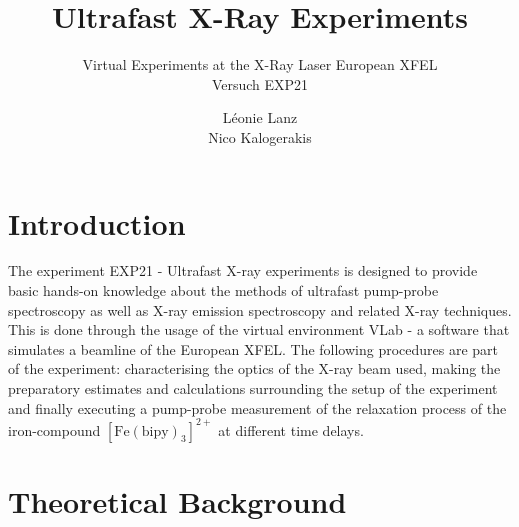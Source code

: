 \documentclass[10pt,a4paper, bibliography=totoc]{scrartcl}
\begin{document}

\title{Ultrafast X-Ray Experiments}
\subtitle{Virtual Experiments at the X-Ray Laser European XFEL\\ Versuch EXP21}
\author{Léonie Lanz \\ Nico Kalogerakis}
\maketitle
\newpage

\tableofcontents
\vfill
\newpage


\section{Introduction}
The experiment EXP21 - Ultrafast X-ray experiments is designed to provide basic hands-on knowledge about the methods of ultrafast pump-probe spectroscopy as well as X-ray emission spectroscopy and related X-ray techniques. This is done through the usage of the virtual environment VLab - a software that simulates a beamline of the European XFEL. The following procedures are part of the experiment: characterising the optics of the X-ray beam used, making the preparatory estimates and calculations surrounding the setup of the experiment and finally executing a pump-probe measurement of the relaxation process of the iron-compound $[\text{Fe}(\text{bipy})_3]^{2+}$ at different time delays.

\section{Theoretical Background}
\end{document}
